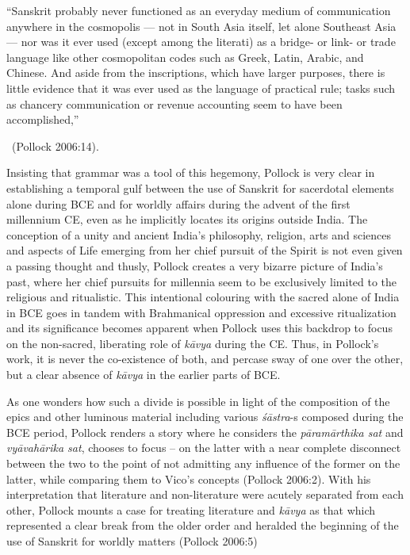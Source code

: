 \begin{myquote}
“Sanskrit probably never functioned as an everyday medium of communication anywhere in the cosmopolis — not in South Asia itself, let alone Southeast Asia — nor was it ever used (except among the literati) as a bridge- or link- or trade language like other cosmopolitan codes such as Greek, Latin, Arabic, and Chinese. And aside from the inscriptions, which have larger purposes, there is little evidence that it was ever used as the language of practical rule; tasks such as chancery communication or revenue accounting seem to have been accomplished,” 

~\hfill (Pollock 2006:14).
\end{myquote}

Insisting that grammar was a tool of this hegemony, Pollock is very clear in establishing a temporal gulf between the use of Sanskrit for sacerdotal elements alone during BCE and for worldly affairs during the advent of the first millennium CE, even as he implicitly locates its origins outside India. The conception of a unity and ancient India’s philosophy, religion, arts and sciences and aspects of Life emerging from her chief pursuit of the Spirit is not even given a passing thought and thusly, Pollock creates a very bizarre picture of India’s past, where her chief pursuits for millennia seem to be exclusively limited to the religious and ritualistic. This intentional colouring with the sacred alone of India in BCE goes in tandem with Brahmanical oppression and excessive ritualization and its significance becomes apparent when Pollock uses this backdrop to focus on the non-sacred, liberating role of \textit{kāvya} during the CE. Thus, in Pollock’s work, it is never the co-existence of both, and percase sway of one over the other, but a clear absence of \textit{kāvya} in the earlier parts of BCE.

As one wonders how such a divide is possible in light of the composition of the epics and other luminous material including various \textit{śāstra}-s composed during the BCE period, Pollock renders a story where he considers the \textit{pāramārthika sat} and \textit{vyāvahārika sat}, chooses to focus – on the latter with a near complete disconnect between the two to the point of not admitting any influence of the former on the latter, while comparing them to Vico’s concepts (Pollock 2006:2). With his interpretation that literature and non-literature were acutely separated from each other, Pollock mounts a case for treating literature and \textit{kāvya} as that which represented a clear break from the older order and heralded the beginning of the use of Sanskrit for worldly matters (Pollock 2006:5)

